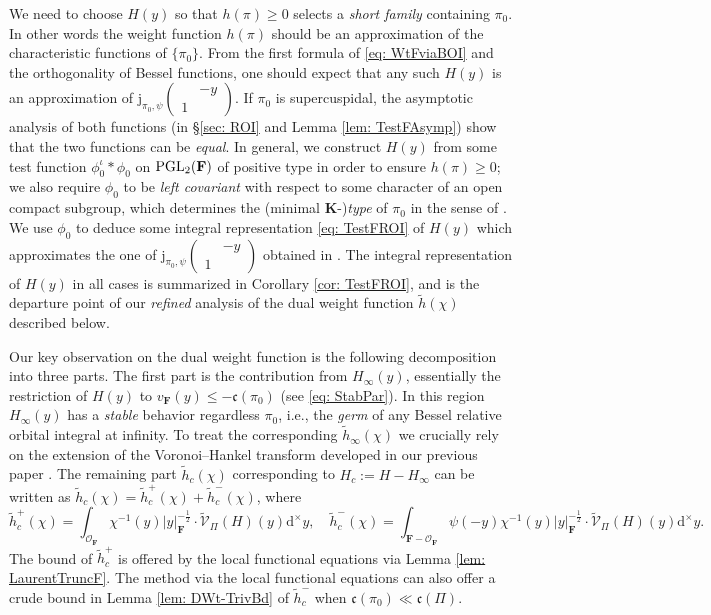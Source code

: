 \documentclass[A4]{amsart}
\def\leq{\leqslant}
\def\geq{\geqslant}
\numberwithin{equation}{section} \everymath{\displaystyle}
\newcommand{\gp}[1]{\mathbf{#1}}
\newcommand{\PGL}{{\rm PGL}}
\newcommand{\ud}{\mathrm{d}}
\newcommand{\F}{\mathbf{F}}
\newcommand{\vO}{\mathcal{O}}
\newcommand{\norm}[1][\cdot]{\lvert #1 \rvert}
\newcommand{\Vor}{\mathcal{V}}
\newcommand{\cond}{\mathfrak{c}}
\newcommand{\BesselF}{\mathrm{j}}
\begin{document}
	We need to choose $H(y)$ so that $h(\pi) \geq 0$ selects a \emph{short family} containing $\pi_0$. In other words the weight function $h(\pi)$ should be an approximation of the characteristic functions of $\{ \pi_0 \}$. From the first formula of \eqref{eq: WtFviaBOI} and the orthogonality of Bessel functions, one should expect that any such $H(y)$ is an approximation of $\BesselF_{\pi_0,\psi}\begin{pmatrix} & -y \\ 1 & \end{pmatrix}$. If $\pi_0$ is supercuspidal, the asymptotic analysis of both functions (in \S \ref{sec: ROI} and Lemma \ref{lem: TestFAsymp}) show that the two functions can be \emph{equal}. In general, we construct $H(y)$ from some test function $\phi_0^{\iota}*\phi_0$ on $\PGL_2(\F)$ of positive type in order to ensure $h(\pi) \geq 0$; we also require $\phi_0$ to be \emph{left covariant} with respect to some character of an open compact subgroup, which determines the (minimal $\gp{K}$-)\emph{type} of $\pi_0$ in the sense of \cite{MP94}. We use $\phi_0$ to deduce some integral representation \eqref{eq: TestFROI} of $H(y)$ which approximates the one of $\BesselF_{\pi_0,\psi}\begin{pmatrix} & -y \\ 1 & \end{pmatrix}$ obtained in \cite[Theorem 1.6]{Wu24+}. The integral representation of $H(y)$ in all cases is summarized in Corollary \ref{cor: TestFROI}, and is the departure point of our \emph{refined} analysis of the dual weight function $\widetilde{h}(\chi)$ described below.
	
	Our key observation on the dual weight function is the following decomposition into three parts. The first part is the contribution from $H_{\infty}(y)$, essentially the restriction of $H(y)$ to $v_{\F}(y) \leq - \cond(\pi_0)$ (see \eqref{eq: StabPar}). In this region $H_{\infty}(y)$ has a \emph{stable} behavior regardless $\pi_0$, i.e., the \emph{germ} of any Bessel relative orbital integral at infinity. To treat the corresponding $\widetilde{h}_{\infty}(\chi)$ we crucially rely on the extension of the Voronoi--Hankel transform developed in our previous paper \cite[Theorem 1.3]{Wu24+}. The remaining part $\widetilde{h}_c(\chi)$ corresponding to $H_c := H-H_{\infty}$ can be written as $\widetilde{h}_c(\chi) = \widetilde{h}_c^+(\chi) + \widetilde{h}_c^-(\chi)$, where 
	$$ \widetilde{h}_c^+(\chi) = \int_{\vO_{\F}} \chi^{-1}(y) \norm[y]_{\F}^{-\frac{1}{2}} \cdot \widetilde{\Vor}_{\Pi}(H)(y) \ud^{\times} y, \quad \widetilde{h}_c^-(\chi) = \int_{\F-\vO_{\F}} \psi(-y) \chi^{-1}(y) \norm[y]_{\F}^{-\frac{1}{2}} \cdot \widetilde{\Vor}_{\Pi}(H)(y) \ud^{\times} y. $$
	The bound of $\widetilde{h}_c^+$ is offered by the local functional equations via Lemma \ref{lem: LaurentTruncF}. The method via the local functional equations can also offer a crude bound in Lemma \ref{lem: DWt-TrivBd} of $\widetilde{h}_c^-$ when $\cond(\pi_0) \ll \cond(\Pi)$. 
	
\end{document}
